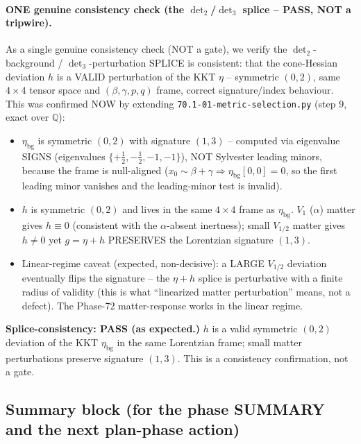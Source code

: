 \paragraph{ONE genuine consistency check (the $\det_2$/$\det_3$ splice -- PASS, NOT a
tripwire).} As a single genuine consistency check (NOT a gate), we verify the
$\det_2$-background / $\det_3$-perturbation SPLICE is consistent: that the cone-Hessian
deviation $h$ is a VALID perturbation of the KKT $\eta$ -- symmetric $(0,2)$, same $4\times4$
tensor space and $(\beta,\gamma,p,q)$ frame, correct signature/index behaviour. This was
confirmed NOW by extending \texttt{70.1-01-metric-selection.py} (step 9, exact over
$\mathbb{Q}$):
\begin{itemize}
  \item $\eta_{\mathrm{bg}}$ is symmetric $(0,2)$ with signature $(1,3)$ -- computed via
        eigenvalue SIGNS (eigenvalues $\{+\tfrac12,-\tfrac12,-1,-1\}$), NOT Sylvester
        leading minors, because the frame is null-aligned ($x_0\sim\beta+\gamma\Rightarrow
        \eta_{\mathrm{bg}}[0,0]=0$, so the first leading minor vanishes and the
        leading-minor test is invalid).
  \item $h$ is symmetric $(0,2)$ and lives in the same $4\times4$ frame as
        $\eta_{\mathrm{bg}}$. $V_1$ ($\alpha$) matter gives $h\equiv0$ (consistent with the
        $\alpha$-absent inertness); small $V_{1/2}$ matter gives $h\neq0$ yet
        $g=\eta+h$ PRESERVES the Lorentzian signature $(1,3)$.
  \item Linear-regime caveat (expected, non-decisive): a LARGE $V_{1/2}$ deviation
        eventually flips the signature -- the $\eta+h$ splice is perturbative with a finite
        radius of validity (this is what ``linearized matter perturbation'' means, not a
        defect). The Phase-72 matter-response works in the linear regime.
\end{itemize}
\textbf{Splice-consistency: PASS (as expected.)} $h$ is a valid symmetric $(0,2)$ deviation
of the KKT $\eta_{\mathrm{bg}}$ in the same Lorentzian frame; small matter perturbations
preserve signature $(1,3)$. This is a consistency confirmation, not a gate.

\subsection{Summary block (for the phase SUMMARY and the next plan-phase action)}
\label{sec701:summaryblock}

